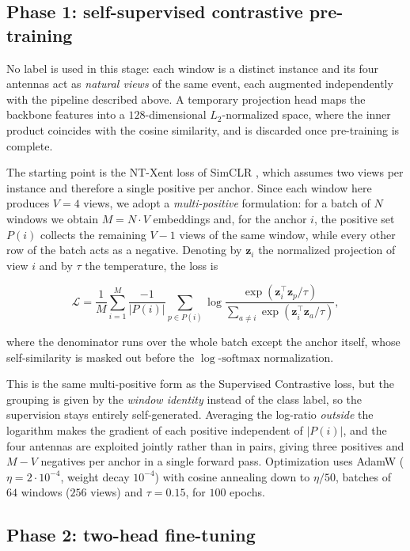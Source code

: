 \subsection{Phase 1: self-supervised contrastive pre-training}
No label is used in this stage: each window is a distinct instance and its
four antennas act as \emph{natural views} of the same event, each augmented
independently with the pipeline described above. A temporary projection head
maps the backbone features into a $128$-dimensional $L_2$-normalized space,
where the inner product coincides with the cosine similarity, and is
discarded once pre-training is complete.

The starting point is the NT-Xent loss of SimCLR \cite{SimCLR}, which assumes two
views per instance and therefore a single positive per anchor. Since each
window here produces $V=4$ views, we adopt a \emph{multi-positive}
formulation: for a batch of $N$ windows we obtain $M=N\cdot V$ embeddings and,
for the anchor $i$, the positive set $P(i)$ collects the remaining $V-1$ views
of the same window, while every other row of the batch acts as a negative.
Denoting by $\mathbf{z}_i$ the normalized projection of view $i$ and by $\tau$
the temperature, the loss is

\begin{equation}
\mathcal{L} = \frac{1}{M}\sum_{i=1}^{M}
\frac{-1}{|P(i)|}\sum_{p\in P(i)}
\log\frac{\exp\!\left(\mathbf{z}_i^{\top}\mathbf{z}_p/\tau\right)}
{\displaystyle\sum_{a\neq i}\exp\!\left(\mathbf{z}_i^{\top}\mathbf{z}_a/\tau\right)},
\label{eq:ntxent_multiview}
\end{equation}

where the denominator runs over the whole batch except the anchor itself,
whose self-similarity is masked out before the
$\log\text{-}\mathrm{softmax}$ normalization.

This is the same multi-positive form as the Supervised Contrastive loss, but
the grouping is given by the \emph{window identity} instead of the class
label, so the supervision stays entirely self-generated. Averaging the
log-ratio \emph{outside} the logarithm makes the gradient of each positive
independent of $|P(i)|$, and the four antennas are exploited jointly rather
than in pairs, giving three positives and $M-V$ negatives per anchor in a
single forward pass. Optimization uses AdamW ($\eta=2\cdot10^{-4}$, weight
decay $10^{-4}$) with cosine annealing down to $\eta/50$, batches of $64$
windows ($256$ views) and $\tau=0.15$, for $100$ epochs.
\subsection{Phase 2: two-head fine-tuning}

